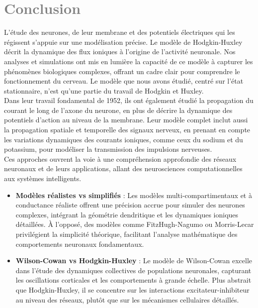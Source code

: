 \chapter*{\textcolor{gray}{Conclusion}}
L'étude des neurones, de leur membrane et des potentiels électriques qui les régissent s'appuie sur une modélisation précise. Le modèle de Hodgkin-Huxley décrit la dynamique des flux ioniques à l'origine de l'activité neuronale. Nos analyses et simulations ont mis en lumière la capacité de ce modèle à capturer les phénomènes biologiques complexes, offrant un cadre clair pour comprendre le fonctionnement du cerveau.
Le modèle que nous avons étudié, centré sur l'état stationnaire, n'est qu'une partie du travail de Hodgkin et Huxley.\\

Dans leur travail fondamental de 1952, ils ont également étudié la propagation du courant le long de l'axone du neurone, en plus de décrire la dynamique des potentiels d'action au niveau de la membrane. Leur modèle complet inclut aussi la propagation spatiale et temporelle des signaux nerveux, en prenant en compte les variations dynamiques des courants ioniques, comme ceux du sodium et du potassium, pour modéliser la transmission des impulsions nerveuses.\\

Ces approches ouvrent la voie à une compréhension approfondie des réseaux neuronaux et de leurs applications, allant des neurosciences computationnelles aux systèmes intelligents.
\begin{itemize}
	\item \textbf{Modèles réalistes vs simplifiés} : Les modèles multi-compartimentaux et à conductance réaliste offrent une précision accrue pour simuler des neurones complexes, intégrant la géométrie dendritique et les dynamiques ioniques détaillées. À l'opposé, des modèles comme FitzHugh-Nagumo ou Morris-Lecar privilégient la simplicité théorique, facilitant l'analyse mathématique des comportements neuronaux fondamentaux.
	\item \textbf{Wilson-Cowan vs Hodgkin-Huxley} : Le modèle de Wilson-Cowan excelle dans l'étude des dynamiques collectives de populations neuronales, capturant les oscillations corticales et les comportements à grande échelle. Plus abstrait que Hodgkin-Huxley, il se concentre sur les interactions excitateur-inhibiteur au niveau des réseaux, plutôt que sur les mécanismes cellulaires détaillés.
\end{itemize}